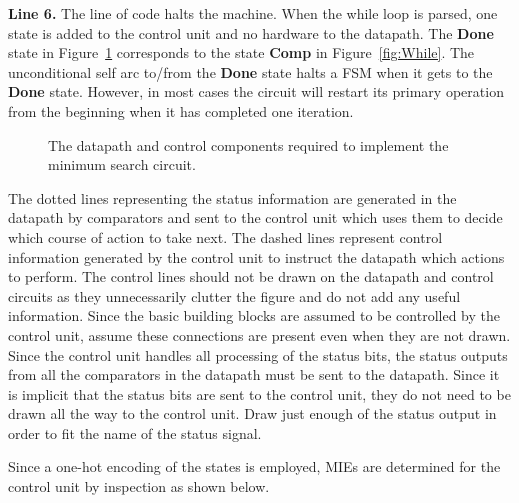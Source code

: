 {\bf Line 6.}  The line of code halts the machine.  When the while loop is parsed,
one state is added to the control unit and no hardware to the 
datapath.  The {\bf Done} state in Figure~\ref{fig:MinSearch} corresponds to 
the state {\bf Comp} in Figure~\ref{fig:While}.  The unconditional self arc
to/from the {\bf Done} state halts a FSM when it gets to the {\bf Done}
state.  However, in most cases the circuit will restart its primary 
operation from the beginning when it has completed one iteration. 

\begin{figure}[ht]
\caption{The datapath and control components required to implement
the minimum search circuit.}
\label{fig:MinSearch}
\end{figure}

The dotted lines representing the status information are generated in the 
datapath by comparators and sent to the control unit which uses them to 
decide which course of action to take next.  The dashed lines 
represent control information generated by the control unit to instruct
the datapath which actions to perform.  The control lines should not be 
drawn on the datapath and control circuits as they unnecessarily clutter 
the figure and do not add any useful information.  Since the basic 
building blocks are assumed to be controlled by the control unit, 
assume these connections are present even when they are not drawn.
Since the control unit handles all processing of the status bits,
the status outputs from all the comparators in the datapath must
be sent to the datapath.  Since it is implicit that the status bits
are sent to the control unit, they do not need to be drawn all the
way to the control unit.  Draw just enough of the status output 
in order to fit the name of the status signal.  

Since a one-hot encoding of the states is employed, MIEs are determined 
for the control unit by inspection as shown below.

